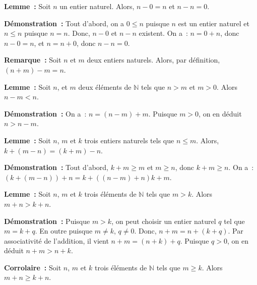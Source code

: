 \noindent\textbf{Lemme :} Soit $n$ un entier naturel. Alors, $n - 0 = n$ et $n - n = 0$. 

\medskip

\noindent\textbf{Démonstration :} Tout d'abord, on a $0 \leq n$ puisque $n$ est un entier naturel et $n \leq n$ puisque $n = n$. 
    Donc, $n - 0$ et $n - n$ existent.
    On a : $n = 0 + n$, donc $n - 0 = n$, et $n = n + 0$, donc $n - n = 0$.

   \done 

\medskip

\noindent\textbf{Remarque :} Soit $n$ et $m$ deux entiers naturels.
    Alors, par définition, $(n+m) - m  = n$.

\medskip

\noindent\textbf{Lemme :} Soit $n$, et $m$ deux éléments de $\mathbb{N}$ tels que $n > m$ et $m > 0$. 
    Alors $n - m < n$.

\medskip

\noindent\textbf{Démonstration :} 
    On a : $n = (n-m) + m$.
    Puisque $m > 0$, on en déduit $n > n-m$.

    \done

\medskip

\noindent\textbf{Lemme :} Soit $n$, $m$ et $k$ trois entiers naturels tels que $n \leq m$.
    Alors, $k + (m-n) = (k+m) - n$.

\medskip

\noindent\textbf{Démonstration :} Tout d'abord, $k+m \geq m$ et $m \geq n$, donc $k+m \geq n$.
    On a : $(k + (m-n)) + n = k + ((n-m) + n)  k + m$.

   \done  

\medskip

\noindent\textbf{Lemme :} Soit $n$, $m$ et $k$ trois éléments de $\mathbb{N}$ tels que $m > k$. 
    Alors $m + n > k + n$.

\medskip

\noindent\textbf{Démonstration :} 
    Puisque $m > k$, on peut choisir un entier naturel $q$ tel que $m = k + q$. 
    En outre puisque $m \neq k$, $q \neq 0$.
    Donc, $n + m = n + (k + q)$. 
    Par associativité de l'addition, il vient $n + m = (n + k) + q$. 
    Puisque $q > 0$, on en déduit $n + m > n + k$.

   \done 

\medskip

\noindent\textbf{Corrolaire :} Soit $n$, $m$ et $k$ trois éléments de $\mathbb{N}$ tels que $m \geq k$. 
    Alors $m + n \geq k + n$.

\medskip


